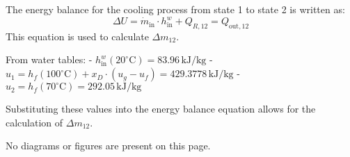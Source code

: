 The energy balance for the cooling process from state 1 to state 2 is written as:  
\[
\Delta U = \dot{m}_{\text{in}} \cdot h_{\text{in}}^{w} + Q_{R,12} = Q_{\text{out},12}
\]  
This equation is used to calculate \( \Delta m_{12} \).  

From water tables:  
- \( h_{\text{in}}^{w}(20^\circ\text{C}) = 83.96 \, \text{kJ/kg} \)  
- \( u_1 = h_f(100^\circ\text{C}) + x_D \cdot (u_g - u_f) = 429.3778 \, \text{kJ/kg} \)  
- \( u_2 = h_f(70^\circ\text{C}) = 292.05 \, \text{kJ/kg} \)  

Substituting these values into the energy balance equation allows for the calculation of \( \Delta m_{12} \).  

No diagrams or figures are present on this page.